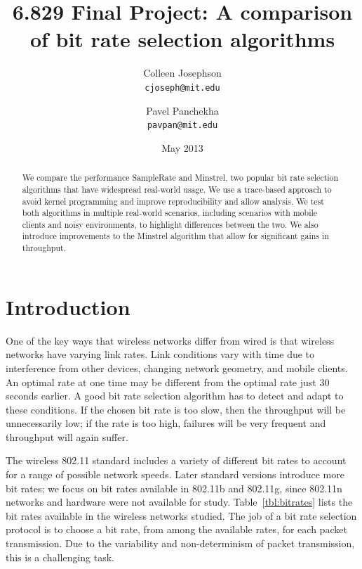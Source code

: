 \documentclass[twocolumn,10pt]{article}
\title{6.829 Final Project: A comparison of bit rate selection algorithms}
\author{Colleen Josephson \\ \texttt{cjoseph@mit.edu}
  \and Pavel Panchekha \\ \texttt{pavpan@mit.edu}}
\date{May 2013}
\begin{document}
\maketitle

\begin{abstract}
We compare the performance SampleRate and Minstrel, two popular bit
rate selection algorithms that have widespread real-world usage.  We
use a trace-based approach to avoid kernel programming and improve
reproducibility and allow analysis.  We test both algorithms in
multiple real-world scenarios, including scenarios with mobile clients
and noisy environments, to highlight differences between the two.  We
also introduce improvements to the Minstrel algorithm that allow for
significant gains in throughput.
\end{abstract}

\section{Introduction}

One of the key ways that wireless networks differ from wired is
that wireless networks have varying link rates.  Link conditions vary
with time due to interference from other devices, changing network
geometry, and mobile clients.  An optimal rate at one time may be
different from the optimal rate just 30 seconds earlier.  A good
bit rate selection algorithm has to detect and adapt to these
conditions.  If the chosen bit rate is too slow, then the throughput
will be unnecessarily low; if the rate is too high, failures will be
very frequent and throughput will again suffer.

The wireless 802.11 standard includes a variety of different bit rates
to account for a range of possible network speeds.  Later standard
versions introduce more bit rates; we focus on bit rates available in
802.11b and 802.11g, since 802.11n networks and hardware were not
available for study.  Table~\ref{tbl:bitrates} lists the bit rates
available in the wireless networks studied.  The job of a bit rate
selection protocol is to choose a bit rate, from among the available
rates, for each packet transmission.  Due to the variability and
non-determinism of packet transmission, this is a challenging task.
\end{document}
